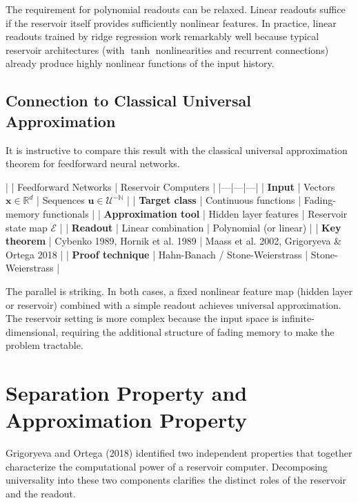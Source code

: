 \begin{remark}
The requirement for polynomial readouts can be relaxed. Linear
readouts suffice if the reservoir itself provides sufficiently nonlinear features. In
practice, linear readouts trained by ridge regression work remarkably well because
typical reservoir architectures (with $\tanh$ nonlinearities and recurrent connections)
already produce highly nonlinear functions of the input history.
\end{remark}


\subsection{Connection to Classical Universal Approximation}\label{sec:15.3.3}

It is instructive to compare this result with the classical universal approximation
theorem for feedforward neural networks.

| | Feedforward Networks | Reservoir Computers |
|---|---|---|
| \textbf{Input} | Vectors $\mathbf{x} \in \mathbb{R}^d$ | Sequences $\mathbf{u} \in \mathcal{U}^{-\mathbb{N}}$ |
| \textbf{Target class} | Continuous functions | Fading-memory functionals |
| \textbf{Approximation tool} | Hidden layer features | Reservoir state map $\mathcal{E}$ |
| \textbf{Readout} | Linear combination | Polynomial (or linear) |
| \textbf{Key theorem} | Cybenko 1989, Hornik et al. 1989 | Maass et al. 2002, Grigoryeva \& Ortega 2018 |
| \textbf{Proof technique} | Hahn-Banach / Stone-Weierstrass | Stone-Weierstrass |

The parallel is striking. In both cases, a fixed nonlinear feature map (hidden layer
or reservoir) combined with a simple readout achieves universal approximation. The
reservoir setting is more complex because the input space is infinite-dimensional,
requiring the additional structure of fading memory to make the problem tractable.


\bigskip


\section{Separation Property and Approximation Property}\label{sec:15.4}

Grigoryeva and Ortega (2018) identified two independent properties that together
characterize the computational power of a reservoir computer. Decomposing
universality into these two components clarifies the distinct roles of the reservoir
and the readout.

